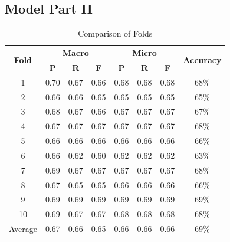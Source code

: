 \subsection*{Model Part II}
\begin{table}[h!]
  \begin{center}
      \begin{tabular}{|c|c|c|c|c|c|c|c|}
          \hline
          \multirow{2}{*}{\textbf{Fold}} & \multicolumn{3}{|c|}{\textbf{Macro}} & \multicolumn{3}{|c|}{\textbf{Micro}} &  \multirow{2}{*}{\textbf{Accuracy}}\\
          \cline{2-7}
          & \textbf{P} & \textbf{R} & \textbf{F} & \textbf{P} & \textbf{R} & \textbf{F} & \\
          \hline
          1 & 0.70 & 0.67 & 0.66 & 0.68 & 0.68 & 0.68 & 68\% \\
          \hline
          2 & 0.66 & 0.66 & 0.65 & 0.65 & 0.65 & 0.65 & 65\% \\
          \hline
          3 & 0.68 & 0.67 & 0.66 & 0.67 & 0.67 & 0.67 & 67\% \\
          \hline
          4 & 0.67 & 0.67 & 0.67 & 0.67 & 0.67 & 0.67 & 68\% \\
          \hline
          5 & 0.66 & 0.66 & 0.66 & 0.66 & 0.66 & 0.66 & 66\% \\
          \hline
          6 & 0.66 & 0.62 & 0.60 & 0.62 & 0.62 & 0.62 & 63\% \\
          \hline
          7 & 0.69 & 0.67 & 0.67 & 0.67 & 0.67 & 0.67 & 68\% \\
          \hline
          8 & 0.67 & 0.65 & 0.65 & 0.66 & 0.66 & 0.66 & 66\% \\
          \hline
          9 & 0.69 & 0.69 & 0.69 & 0.69 & 0.69 & 0.69 & 69\% \\
          \hline
          10 & 0.69 & 0.67 & 0.67 & 0.68 & 0.68 & 0.68 & 68\% \\
          \hline
          Average & 0.67 & 0.66 & 0.65 & 0.66 & 0.66 & 0.66 & 69\% \\
          \hline
      \end{tabular}
      \caption{Comparison of Folds}
      \label{tab:model-comparison}
  \end{center}
\end{table}
\vspace*{1em}
